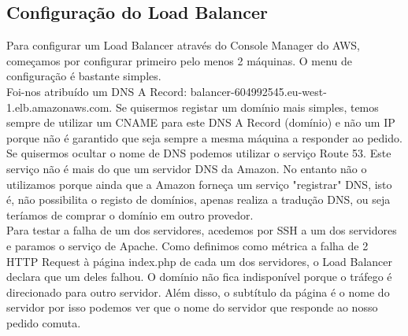 \subsection{Configuração do Load Balancer}
Para configurar um Load Balancer através do Console Manager do AWS, começamos por configurar primeiro pelo menos 2 máquinas. O menu de configuração é bastante simples. \\
Foi-nos atribuído um DNS A Record:  balancer-604992545.eu-west-1.elb.amazonaws.com. Se quisermos registar um domínio mais simples, temos sempre de utilizar um CNAME para este DNS A Record (domínio) e não um IP porque não é garantido que seja sempre a mesma máquina a responder ao pedido.\\
Se quisermos ocultar o nome de DNS podemos utilizar o serviço Route 53. Este serviço não é mais do que um servidor DNS da Amazon. No entanto não o utilizamos porque ainda que a Amazon forneça um serviço "registrar" DNS, isto é, não possibilita o registo de domínios, apenas realiza a tradução DNS, ou seja teríamos de comprar o domínio em outro provedor. \\
Para testar a falha de um dos servidores, acedemos por SSH a um dos servidores e paramos o serviço de Apache. Como definimos como métrica a falha de 2 HTTP Request à página index.php de cada um dos servidores, o Load Balancer declara que um deles falhou. O domínio não fica indisponível porque o tráfego é direcionado para outro servidor. Além disso, o subtítulo da página é o nome do servidor por isso podemos ver que o nome do servidor que responde ao nosso pedido comuta.\\


